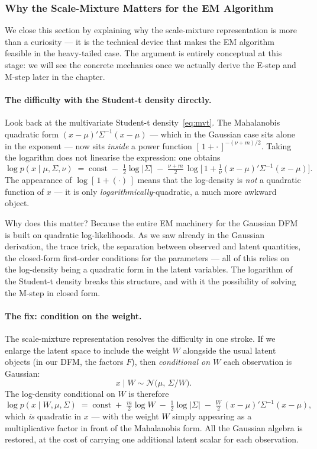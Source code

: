 \documentclass[11pt, a4paper, oneside]{article}
\begin{document}
\subsubsection{Why the Scale-Mixture Matters for the EM Algorithm}

We close this section by explaining why the scale-mixture representation
is more than a curiosity — it is the technical device that makes the EM
algorithm feasible in the heavy-tailed case. The argument is entirely
conceptual at this stage: we will see the concrete mechanics once we
actually derive the E-step and M-step later in the chapter.

\paragraph{The difficulty with the Student-t density directly.}
Look back at the multivariate Student-t density~\eqref{eq:mvt}. The
Mahalanobis quadratic form $(x - \mu)'\Sigma^{-1}(x - \mu)$ — which in
the Gaussian case sits alone in the exponent — now sits \emph{inside} a
power function $[\,1 + \cdot\,]^{-(\nu + m)/2}$. Taking the logarithm
does not linearise the expression: one obtains
\[
\log p(x \mid \mu, \Sigma, \nu) \;=\; \text{const} \;-\; \tfrac{1}{2}\log|\Sigma|
\;-\; \tfrac{\nu + m}{2}\,\log\!\Big[\,1 + \tfrac{1}{\nu}(x-\mu)'\Sigma^{-1}(x-\mu)\Big].
\]
The appearance of $\log[\,1 + (\cdot)\,]$ means that the log-density is
\emph{not} a quadratic function of $x$ — it is only
\emph{logarithmically}-quadratic, a much more awkward object.

Why does this matter? Because the entire EM machinery for the Gaussian
DFM is built on quadratic log-likelihoods. As we saw already in the
Gaussian derivation, the trace trick, the separation between observed
and latent quantities, the closed-form first-order conditions for the
parameters — all of this relies on the log-density being a quadratic
form in the latent variables. The logarithm of the Student-t density
breaks this structure, and with it the possibility of solving the
M-step in closed form.

\paragraph{The fix: condition on the weight.}
The scale-mixture representation resolves the difficulty in one stroke.
If we enlarge the latent space to include the weight $W$ alongside the
usual latent objects (in our DFM, the factors $F$), then
\emph{conditional on $W$} each observation is Gaussian:
\[
x \mid W \sim \mathcal{N}\!\big(\mu,\, \Sigma / W\big).
\]
The log-density conditional on $W$ is therefore
\[
\log p(x \mid W, \mu, \Sigma) \;=\; \text{const} \;+\; \tfrac{m}{2}\log W \;-\; \tfrac{1}{2}\log|\Sigma|
\;-\; \tfrac{W}{2}\,(x-\mu)'\Sigma^{-1}(x-\mu),
\]
which \emph{is} quadratic in $x$ — with the weight $W$ simply appearing
as a multiplicative factor in front of the Mahalanobis form. All the
Gaussian algebra is restored, at the cost of carrying one additional
latent scalar for each observation.
\end{document}
